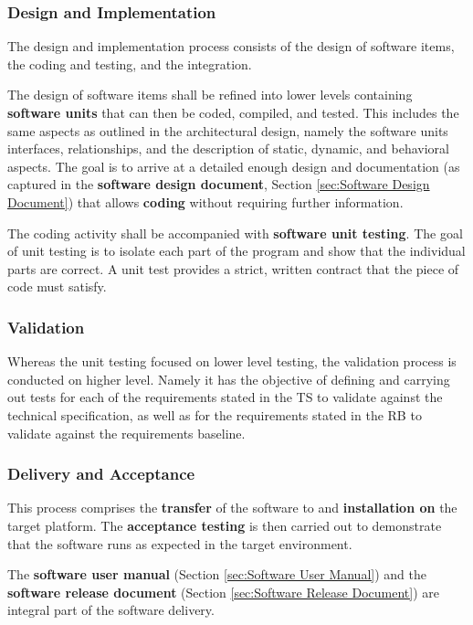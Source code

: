 \subsubsection{Design and Implementation}

The design and implementation process consists of the design of software items, the coding and testing, and the integration.

The design of software items shall be refined into lower levels containing \textbf{software units} that can then be coded, compiled, and tested. This includes the same aspects as outlined in the architectural design, namely the software units interfaces, relationships, and the description of static, dynamic, and behavioral aspects. The goal is to arrive at a detailed enough design and documentation (as captured in the \textbf{software design document}, Section \ref{sec:Software Design Document}) that allows \textbf{coding} without requiring further information.

The coding activity shall be accompanied with \textbf{software unit testing}. The goal of unit testing is to isolate each part of the program and show that the individual parts are correct. A unit test provides a strict, written contract that the piece of code must satisfy.

\subsubsection{Validation}

Whereas the unit testing focused on lower level testing, the validation process is conducted on higher level. Namely it has the objective of defining and carrying out tests for each of the requirements stated in the TS to validate against the technical specification, as well as for the requirements stated in the RB to validate against the requirements baseline.

\subsubsection{Delivery and Acceptance}

This process comprises the \textbf{transfer} of the software to and \textbf{installation on} the target platform. The \textbf{acceptance testing} is then carried out to demonstrate that the software runs as expected in the target environment.

The \textbf{software user manual} (Section \ref{sec:Software User Manual}) and the \textbf{software release document} (Section \ref{sec:Software Release Document}) are integral part of the software delivery.

